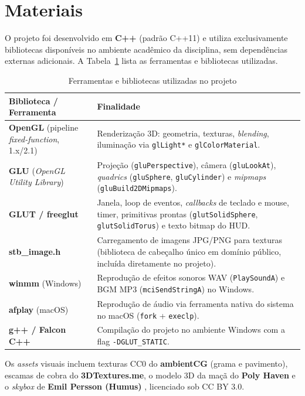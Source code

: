 \documentclass[12pt]{article}
\begin{document}
\section{Materiais}

O projeto foi desenvolvido em \textbf{C++} (padrão C++11) e utiliza
exclusivamente bibliotecas disponíveis no ambiente acadêmico da disciplina,
sem dependências externas adicionais. A Tabela~\ref{tab:materiais} lista as
ferramentas e bibliotecas utilizadas.

\begin{table}[ht]
\centering
\caption{Ferramentas e bibliotecas utilizadas no projeto}
\label{tab:materiais}
\begin{tabular}{p{4.2cm}p{8.2cm}}
\hline
\textbf{Biblioteca / Ferramenta} & \textbf{Finalidade} \\
\hline
\textbf{OpenGL} (pipeline \textit{fixed-function}, 1.x/2.1)
  & Renderização 3D: geometria, texturas, \textit{blending}, iluminação via
    \texttt{glLight*} e \texttt{glColorMaterial}. \\
\textbf{GLU} (\textit{OpenGL Utility Library})
  & Projeção (\texttt{gluPerspective}), câmera (\texttt{gluLookAt}),
    \textit{quadrics} (\texttt{gluSphere}, \texttt{gluCylinder}) e
    \textit{mipmaps} (\texttt{gluBuild2DMipmaps}). \\
\textbf{GLUT / freeglut}
  & Janela, loop de eventos, \textit{callbacks} de teclado e mouse, timer,
    primitivas prontas (\texttt{glutSolidSphere}, \texttt{glutSolidTorus}) e
    texto bitmap do HUD. \\
\textbf{stb\_image.h} \cite{stb}
  & Carregamento de imagens JPG/PNG para texturas (biblioteca de cabeçalho
    único em domínio público, incluída diretamente no projeto). \\
\textbf{winmm} (Windows)
  & Reprodução de efeitos sonoros WAV (\texttt{PlaySoundA}) e BGM MP3
    (\texttt{mciSendStringA}) no Windows. \\
\textbf{afplay} (macOS)
  & Reprodução de áudio via ferramenta nativa do sistema no macOS
    (\texttt{fork} + \texttt{execlp}). \\
\textbf{g++ / Falcon C++}
  & Compilação do projeto no ambiente Windows com a flag
    \texttt{-DGLUT\_STATIC}. \\
\hline
\end{tabular}
\end{table}

Os \textit{assets} visuais incluem texturas CC0 do \textbf{ambientCG}
\cite{ambientcg} (grama e pavimento), escamas de cobra do
\textbf{3DTextures.me}, o modelo 3D da maçã do \textbf{Poly Haven}
\cite{polyhaven} e o \textit{skybox} de \textbf{Emil Persson (Humus)}
\cite{humus}, licenciado sob CC BY 3.0.
\end{document}
